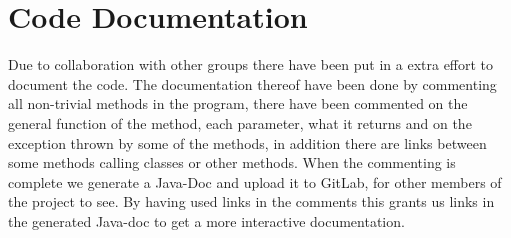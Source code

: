 \section{Code Documentation}\label{sec:code_documentation}
Due to collaboration with other groups there have been put in a extra effort to document the code. The documentation thereof have been done by commenting all non-trivial methods in the program, there have been commented on the general function of the method, each parameter, what it returns and on the exception thrown by some of the methods, in addition there are links between some methods calling classes or other methods. When the commenting is complete we generate a Java-Doc and upload it to GitLab, for other members of the project to see. By having used links in the comments this grants us links in the generated Java-doc to get a more interactive documentation. 
